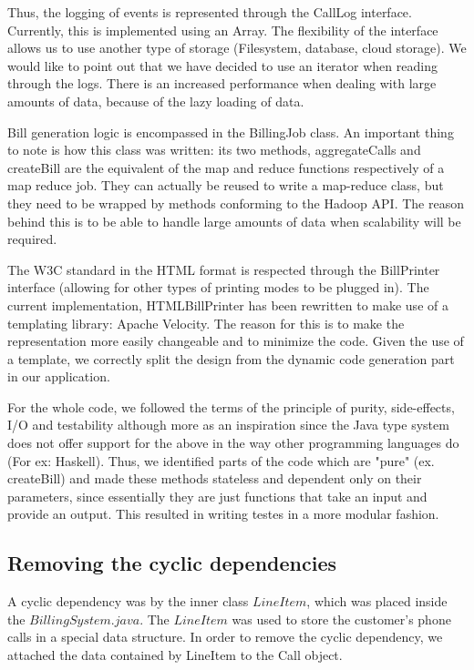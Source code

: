 \documentclass[11pt,twocolumn]{article} %
\begin{document}
Thus, the logging of events is represented through the CallLog interface. Currently, this is implemented using an Array.
The flexibility of the interface allows us to use another type of storage (Filesystem, database, cloud storage). 
We would like to point out that we have decided to use an iterator when reading through the logs. There is an increased 
performance when dealing with large amounts of data, because of the lazy loading of data.

Bill generation logic is encompassed in the BillingJob class. An important thing to note is how this class was written: its two methods, aggregateCalls
and createBill are the equivalent of the map and reduce functions respectively of a map reduce job. They can actually be reused to write a map-reduce
class, but they need to be wrapped by methods conforming to the Hadoop API. The reason behind this is to be able to handle large amounts of data
when scalability will be required.

The W3C standard in the HTML format is respected through the BillPrinter interface (allowing for other types of printing modes to be plugged in).
The current implementation, HTMLBillPrinter has been rewritten to make use of a templating library: Apache Velocity. The reason for this is to make
the representation more easily changeable and to minimize the code. Given the use of a template, we correctly split the design from the dynamic code generation
part in our application.

For the whole code, we followed the terms of the principle of purity, side-effects, I/O and testability although more as an inspiration since the
Java type system does not offer support for the above in the way other programming languages do (For ex: Haskell). Thus, we identified parts of the code which are
"pure" (ex. createBill) and made these methods stateless and dependent only on their parameters, since essentially they are just functions
that take an input and provide an output. This resulted in writing testes in a more modular fashion. 

\subsection{Removing the cyclic dependencies}
A cyclic dependency was by the inner class $LineItem$, which was placed inside the $BillingSystem.java$.
The $LineItem$ was used to store the customer's phone calls in a special data structure. In order to remove the cyclic dependency, we attached the
data contained by LineItem to the Call object.
\end{document}
